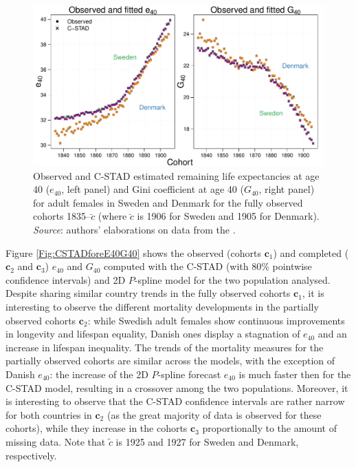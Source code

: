 \documentclass[11pt, a4paper]{article}
\begin{document}
\begin{figure}[t]
	\begin{center}
		\includegraphics[scale=0.57]{./Figures/F5.pdf} 
		\caption{Observed and C-STAD estimated remaining life expectancies at age 40 ($e_{40}$, left panel) and Gini coefficient at age 40 ($G_{40}$, right panel) for adult females in Sweden and Denmark for the fully observed cohorts 1835--$\breve{c}$ (where $\breve{c}$ is 1906 for Sweden and 1905 for Denmark).\\ \small \textit{Source}: authors' elaborations on data from the \cite{HMD}.\label{Fig:CSTADfitE40G40}}    
	\end{center}
\end{figure}

Figure \ref{Fig:CSTADforeE40G40} shows the observed (cohorts $\bm{c}_1$) and completed ($\bm{c}_2$ and $\bm{c}_3$) $e_{40}$ and $G_{40}$ computed with the C-STAD (with 80\% pointwise confidence intervals) and 2D $P$-spline model for the two population analysed. Despite sharing similar country trends in the fully observed cohorts $\bm{c}_1$, it is interesting to observe the different mortality developments in the partially observed cohorts $\bm{c}_2$: while Swedish adult females show continuous improvements in longevity and lifespan equality, Danish ones display a stagnation of $e_{40}$ and an increase in lifespan inequality. The trends of the mortality measures for the partially observed cohorts are similar across the models, with the exception of Danish $e_{40}$: the increase of the 2D $P$-spline forecast $e_{40}$ is much faster then for the C-STAD model, resulting in a crossover among the two populations. Moreover, it is interesting to observe that the C-STAD confidence intervals are rather narrow for both countries in $\bm{c}_2$ (as the great majority of data is observed for these cohorts), while they increase in the cohorts $\bm{c}_3$ proportionally to the amount of missing data. Note that $\tilde{c}$ is 1925 and 1927 for Sweden and Denmark, respectively.  
\end{document}
